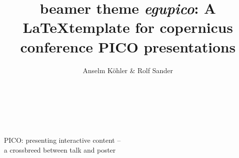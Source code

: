 \documentclass[usepdftitle=false,unknownkeysallowed,8pt]{beamer}
\title{beamer theme \textit{egupico}: A \LaTeX template for copernicus conference PICO presentations}
\author{Anselm K\"ohler \& Rolf Sander}
\institute{Git Repository: \url{https://github.com/snowtechblog/pico-latex-presentation}}
\begin{document}

\begin{frame}

  \begin{center}
    \centering {} \inserttitle\\\medskip
    \centering {} \insertauthor\\\medskip
    \centering {} \insertinstitute
  \end{center}
  \vspace{3cm}
  \begin{columns}%
    \begin{column}{0.66\textwidth}
      \large PICO: presenting interactive content -- \\ a crossbreed between talk and poster
    \end{column}
    \begin{column}{0.3\textwidth}
    \end{column}
  \end{columns}

\end{frame}

\end{document}
